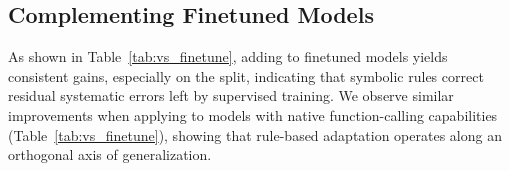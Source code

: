 \subsection{Complementing Finetuned Models}


As shown in Table~\ref{tab:vs_finetune}, adding \shortname to finetuned models yields consistent
gains, especially on the \unseen split, indicating that symbolic rules correct residual
systematic errors left by supervised training. We observe similar improvements when applying
\shortname to models with native function-calling capabilities (Table~\ref{tab:vs_finetune}),
showing that rule-based adaptation operates along an orthogonal axis of generalization.
